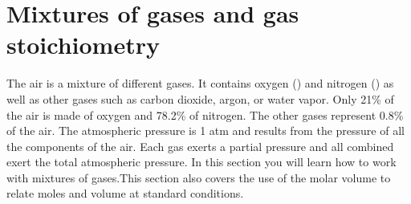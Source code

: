 \documentclass[main.tex]{subfiles}
\begin{document}
\section{Mixtures of gases and gas stoichiometry}
The air is a mixture of different gases. It contains oxygen () and nitrogen () as well as other gases such as carbon dioxide, argon, or water vapor. Only 21\% of the air is made of oxygen and 78.2\% of nitrogen. The other gases represent 0.8\% of the air. The atmospheric pressure is 1 atm and results from the pressure of all the components of the air. Each gas exerts a partial pressure and all combined exert the total atmospheric pressure. In this section you will learn how to work with mixtures of gases.This section also covers the use of the molar volume to relate moles and volume at standard conditions.
\end{document}
